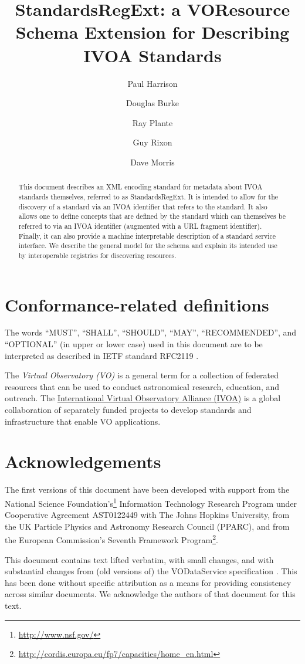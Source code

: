 \documentclass[11pt,a4paper]{ivoa}
\author[http://www.ivoa.net/twiki/bin/view/IVOA/PaulHarrison]{Paul Harrison}
\author[http://www.ivoa.net/twiki/bin/view/IVOA/DougBurke]{Douglas Burke}
\author[http://www.ivoa.net/twiki/bin/view/IVOA/RayPlante]{Ray Plante}
\author[http://www.ivoa.net/twiki/bin/view/IVOA/GuyRixon]{Guy Rixon}
\author[http://www.ivoa.net/twiki/bin/view/IVOA/DaveMorris]{Dave Morris}
\title{StandardsRegExt: a VOResource Schema Extension for Describing
IVOA Standards}
\begin{document}
\begin{abstract}
This document describes an XML encoding standard for metadata about
IVOA standards themselves, referred to as StandardsRegExt.  It is intended
to allow for the discovery of a standard via an IVOA identifier that
refers to the standard.  It also allows one to define concepts that
are defined by the standard which can themselves be referred to via an
IVOA identifier (augmented with a URL fragment identifier).  Finally,
it can also provide a machine interpretable description of a standard
service interface.  We describe the general model for the schema and
explain its intended use by interoperable registries for discovering
resources.
\end{abstract}


\section*{Conformance-related definitions}

The words ``MUST'', ``SHALL'', ``SHOULD'', ``MAY'', ``RECOMMENDED'', and
``OPTIONAL'' (in upper or lower case) used in this document are to be
interpreted as described in IETF standard RFC2119 \citep{std:RFC2119}.

The \emph{Virtual Observatory (VO)} is a
general term for a collection of federated resources that can be used
to conduct astronomical research, education, and outreach.
The \href{https://www.ivoa.net}{International
Virtual Observatory Alliance (IVOA)} is a global
collaboration of separately funded projects to develop standards and
infrastructure that enable VO applications.

\section*{Acknowledgements}

The first versions of this document have been developed with support from the
National Science Foundation's\footnote{\url{http://www.nsf.gov/}}
Information Technology Research Program under Cooperative Agreement
AST0122449 with The Johns Hopkins University, from the
UK Particle Physics and Astronomy Research Council
(PPARC), and from the
European Commission's Seventh Framework
Program\footnote{\url{http://cordis.europa.eu/fp7/capacities/home_en.html}}.

This document contains text lifted verbatim, with small changes, and
with substantial changes from (old versions of) the VODataService
specification \citep{2021ivoa.spec.1102D}.  This
has been done without specific attribution as a means for providing
consistency across similar documents.  We acknowledge the authors of
that document for this text.
\end{document}
